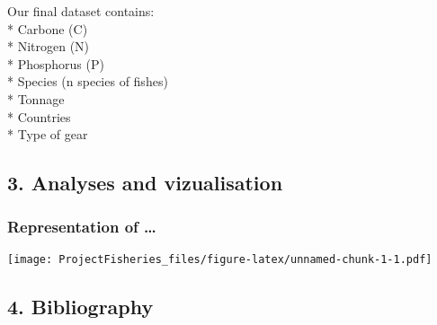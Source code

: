 \documentclass[
]{article}
\begin{document}
Our final dataset contains:\\
* Carbone (C)\\
* Nitrogen (N)\\
* Phosphorus (P)\\
* Species (n species of fishes)\\
* Tonnage\\
* Countries\\
* Type of gear

\hypertarget{analyses-and-vizualisation}{%
\subsection{3. Analyses and
vizualisation}\label{analyses-and-vizualisation}}

\hypertarget{representation-of}{%
\subsubsection{Representation of \ldots{}}\label{representation-of}}

\texttt{[image: ProjectFisheries\_files/figure-latex/unnamed-chunk-1-1.pdf]}

\hypertarget{bibliography}{%
\subsection{4. Bibliography}\label{bibliography}}
\end{document}
